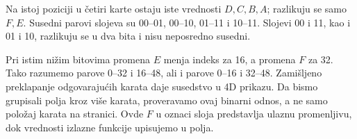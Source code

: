 
Na istoj poziciji u četiri karte ostaju iste vrednosti \(D,C,B,A\); razlikuju se samo \(F,E\). Susedni parovi slojeva su 00–01, 00–10, 01–11 i 10–11. Slojevi 00 i 11, kao i 01 i 10, razlikuju se u dva bita i nisu neposredno susedni.

Pri istim nižim bitovima promena \(E\) menja indeks za 16, a promena \(F\) za 32. Tako razumemo parove 0–32 i 16–48, ali i parove 0–16 i 32–48. Zamišljeno preklapanje odgovarajućih karata daje susedstvo u 4D prikazu. Da bismo grupisali polja kroz više karata, proveravamo ovaj binarni odnos, a ne samo položaj karata na stranici. Ovde \(F\) u oznaci sloja predstavlja ulaznu promenljivu, dok vrednosti izlazne funkcije upisujemo u polja.
